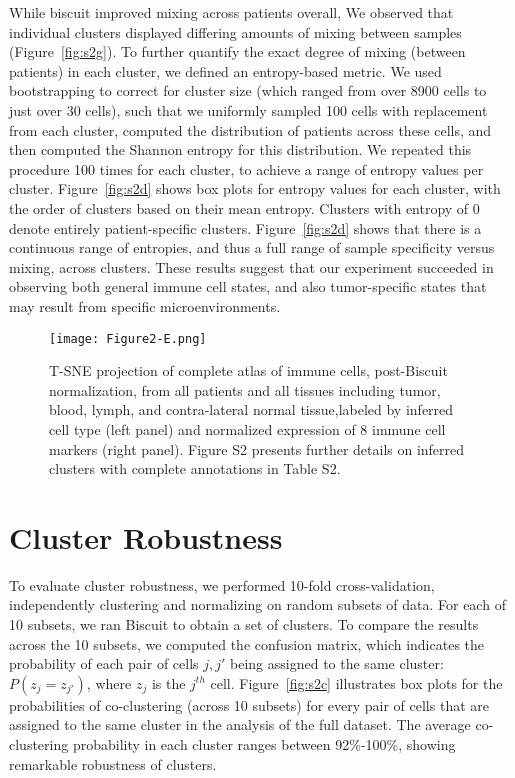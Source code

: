 While biscuit improved mixing across patients overall, We observed that individual clusters displayed differing amounts of mixing between samples (Figure~\ref{fig:s2g}).
To further quantify the exact degree of mixing (between patients) in each cluster, we defined an entropy-based metric.
We used bootstrapping to correct for cluster size (which ranged from over 8900 cells to just over 30 cells), such that we uniformly sampled 100 cells with replacement from each cluster, computed the distribution of patients across these cells, and then computed the Shannon entropy for this distribution.
We repeated this procedure 100 times for each cluster, to achieve a range of entropy values per cluster.
Figure~\ref{fig:s2d} shows box plots for entropy values for each cluster, with the order of clusters based on their mean entropy.
Clusters with entropy of 0 denote entirely patient-specific clusters.
Figure~\ref{fig:s2d} shows that there is a continuous range of entropies, and thus a full range of sample specificity versus mixing, across clusters.
These results suggest that our experiment succeeded in observing both general immune cell states, and also tumor-specific states that may result from specific microenvironments. 

\begin{figure}
\centering
\texttt{[image: Figure2-E.png]}
\caption{T-SNE projection of complete atlas of immune cells, post-Biscuit normalization, from all patients and all tissues including tumor, blood, lymph, and contra-lateral normal tissue,labeled by inferred cell type (left panel) and normalized expression of 8 immune cell markers (right panel). Figure S2 presents further details on inferred clusters with complete annotations in Table S2.
} %
\label{fig:2e}
\end{figure}

\section{Cluster Robustness}

To evaluate cluster robustness, we performed 10-fold cross-validation, independently clustering and normalizing on random subsets of data.
For each of 10 subsets, we ran Biscuit to obtain a set of clusters.
To compare the results across the 10 subsets, we computed the confusion matrix, which indicates the probability of each pair of cells \(j,j'\) being assigned to the same cluster: \(P(z_{j} = z_{j'})\), where $z_j$ is the $j^{th}$ cell.
Figure~\ref{fig:s2c} illustrates box plots for the probabilities of co-clustering (across 10 subsets) for every pair of cells that are assigned to the same cluster in the analysis of the full dataset.
The average co-clustering probability in each cluster ranges between 92\%-100\%, showing remarkable robustness of clusters.

